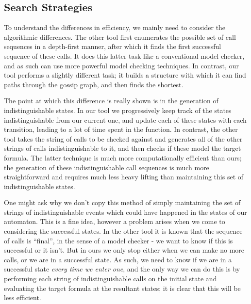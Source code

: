 \documentclass[10pt, a4paper]{report}
\begin{document}
\subsection{Search Strategies}

To understand the differences in efficiency, we mainly need to consider the
algorithmic differences. The other tool first enumerates the possible set of
call sequences in a depth-first manner, after which it finds the first
successful sequence of these calls. It does this latter task like a conventional
model checker, and as such can use more powerful model checking techniques. In
contrast, our tool performs a slightly different task; it builds a structure
with which it can find paths through the gossip graph, and then finds the
shortest.

The point at which this difference is really shown is in the generation of
indistinguishable states. In our tool we progressively keep track of the states
indistinguishable from our current one, and update each of these states with
each transition, leading to a lot of time spent in the  function.
In contrast, the other tool takes the string of calls to be checked against and
generates all of the other strings of calls indistinguishable to it, and then
checks if these model the target formula. The latter technique is much more
computationally efficient than ours; the generation of these indistinguishable
call sequences is much more straightforward and requires much less heavy lifting
than maintaining this set of indistinguishable states.


One might ask why we don't copy this method of simply maintaining the set of
strings of indistinguishable events which could have happened in the states of
our automaton. This is a fine idea, however a problem arises when we come to
considering the successful states. In the other tool it is known that the
sequence of calls is ``final'', in the sense of a model checker - we want to
know if this is successful or it isn't. But in ours we only stop either when we
can make no more calls, or we are in a successful state. As such, we need to
know if we are in a successful state \emph{every time we enter one}, and the
only way we can do this is by performing each string of indistinguishable calls
on the initial state and evaluating the target formula at the resultant states;
it is clear that this will be less efficient.
\end{document}
